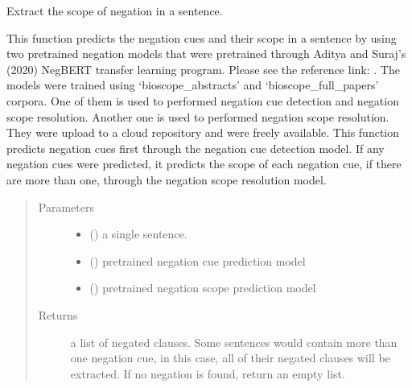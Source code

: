 \documentclass[letterpaper,10pt,english]{sphinxmanual}
\begin{document}
\begin{fulllineitems}
\label{\detokenize{negation_cue_scope:negation_cue_scope.negation_scope}}
\sphinxAtStartPar
Extract the scope of negation in a sentence.

\sphinxAtStartPar
This function predicts the negation cues and their scope in a sentence by using two pre\sphinxhyphen{}trained negation models that were pre\sphinxhyphen{}trained through Aditya and Suraj’s (2020) NegBERT transfer learning program.
Please see the reference link: . The models were trained using ‘bioscope\_abstracts’ and ‘bioscope\_full\_papers’ corpora.
One of them is used to performed negation cue detection and negation scope resolution. Another one is used to performed negation scope resolution. They were upload to a cloud repository and were freely available.
This function predicts negation cues first through the negation cue detection model. If any negation cues were predicted, it predicts the scope of each negation cue, if there are more than one, through the negation scope resolution model.
\begin{quote}\begin{description}
\item[{Parameters}] \leavevmode\begin{itemize}
\item {} 
\sphinxAtStartPar
{} () \textendash{} a single sentence.

\item {} 
\sphinxAtStartPar
{} () \textendash{} pre\sphinxhyphen{}trained negation cue prediction model

\item {} 
\sphinxAtStartPar
{} () \textendash{} pre\sphinxhyphen{}trained negation scope prediction model

\end{itemize}

\item[{Returns}] \leavevmode
\sphinxAtStartPar
a list of negated clauses. Some sentences would contain more than one negation cue, in this case, all of their negated clauses will be extracted. If no negation is found, return an empty list.


\end{description}
\end{quote}
\end{fulllineitems}
\end{document}
